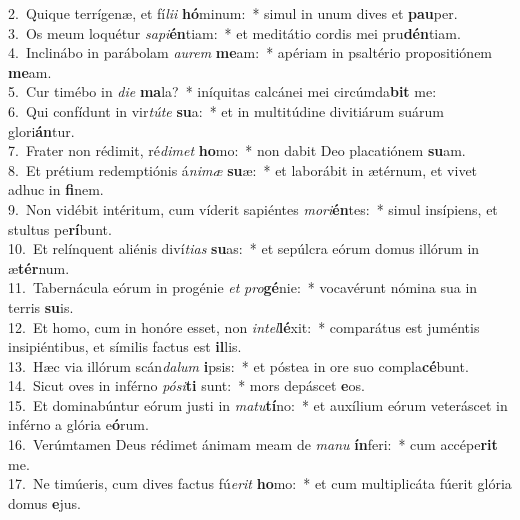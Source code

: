{2.~}Quique terrígenæ, et fí\textit{li}\textit{i} \textbf{hó}minum:~* simul in unum dives et \textbf{pau}per.\\
{3.~}Os meum loquétur \textit{sa}\textit{pi}\textbf{én}tiam:~* et meditátio cordis mei pru\textbf{dén}tiam.\\
{4.~}Inclinábo in parábolam \textit{au}\textit{rem} \textbf{me}am:~* apériam in psaltério propositiónem \textbf{me}am.\\
{5.~}Cur timébo in \textit{di}\textit{e} \textbf{ma}la?~* iníquitas calcánei mei circúmda\textbf{bit} me:\\
{6.~}Qui confídunt in vir\textit{tú}\textit{te} \textbf{su}a:~* et in multitúdine divitiárum suárum glori\textbf{án}tur.\\
{7.~}Frater non rédimit, ré\textit{di}\textit{met} \textbf{ho}mo:~* non dabit Deo placatiónem \textbf{su}am.\\
{8.~}Et prétium redemptiónis á\textit{ni}\textit{mæ} \textbf{su}æ:~* et laborábit in ætérnum, et vivet adhuc in \textbf{fi}nem.\\
{9.~}Non vidébit intéritum, cum víderit sapiéntes \textit{mo}\textit{ri}\textbf{én}tes:~* simul insípiens, et stultus pe\textbf{rí}bunt.\\
{10.~}Et relínquent aliénis diví\textit{ti}\textit{as} \textbf{su}as:~* et sepúlcra eórum domus illórum in æ\textbf{tér}num.\\
{11.~}Tabernácula eórum in progénie \textit{et} \textit{pro}\textbf{gé}nie:~* vocavérunt nómina sua in terris \textbf{su}is.\\
{12.~}Et homo, cum in honóre esset, non \textit{in}\textit{tel}\textbf{lé}xit:~* comparátus est juméntis insipiéntibus, et símilis factus est \textbf{il}lis.\\
{13.~}Hæc via illórum scán\textit{da}\textit{lum} \textbf{i}psis:~* et póstea in ore suo compla\textbf{cé}bunt.\\
{14.~}Sicut oves in inférno \textit{pó}\textit{si}\textbf{ti} sunt:~* mors depáscet \textbf{e}os.\\
{15.~}Et dominabúntur eórum justi in \textit{ma}\textit{tu}\textbf{tí}no:~* et auxílium eórum veteráscet in inférno a glória e\textbf{ó}rum.\\
{16.~}Verúmtamen Deus rédimet ánimam meam de \textit{ma}\textit{nu} \textbf{ín}feri:~* cum accépe\textbf{rit} me.\\
{17.~}Ne timúeris, cum dives factus fú\textit{e}\textit{rit} \textbf{ho}mo:~* et cum multiplicáta fúerit glória domus \textbf{e}jus.\\
